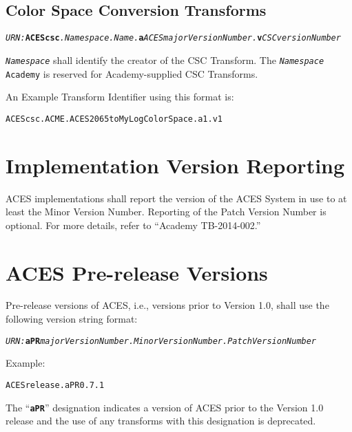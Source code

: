 \subsection{Color Space Conversion Transforms}
\begin{sloppypar}
\texttt{\textit{URN:}\textbf{ACEScsc}\textit{.Namespace\+}\textit{.Name.\+}\textbf{a}\textit{ACESmajorVersionNumber.}\textbf{v}\textit{CSCversionNumber}}
\end{sloppypar}

\texttt{\textit{Namespace}} shall identify the creator of the CSC Transform. The \texttt{\textit{Namespace}} \texttt{Academy} is reserved for Academy-supplied CSC Transforms.

An Example Transform Identifier using this format is: 
\begin{listize}
	\item {\small \texttt{\urn{}ACEScsc.ACME.ACES2065toMyLogColorSpace.\+a1.\+v1}}
\end{listize}



\section{Implementation Version Reporting}
ACES implementations shall report the version of the ACES System in use to at least the Minor Version Number.  Reporting of the Patch Version Number is optional. For more details, refer to ``Academy TB-2014-002.''

\section{ACES Pre-release Versions}
Pre-release versions of ACES, i.e., versions prior to Version 1.0, shall use the following version string format:

\texttt{\textit{URN:}\textbf{aPR}\textit{majorVersionNumber.MinorVersionNumber.PatchVersionNumber}}

Example:
\begin{listize}
	\item {\small \texttt{\urn{}ACESrelease.aPR0.7.1}}
\end{listize}

The ``\texttt{\textbf{aPR}}'' designation indicates a version of ACES prior to the Version 1.0 release and the use of any transforms with this designation is deprecated.